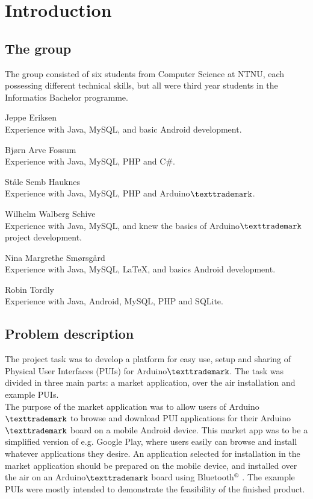 \chapter{Introduction}
\section{The group}
The group consisted of six students from Computer Science at NTNU, each possessing different technical skills, but all were third year students in the Informatics Bachelor programme.

\begin{description}
	\item{Jeppe Eriksen}\hfill \\
		Experience with Java, MySQL, and basic Android development.
	\item{Bjørn Arve Fossum}\hfill \\
		Experience with Java, MySQL, PHP and C\#.
	\item{Ståle Semb Hauknes}\hfill \\
		Experience with Java, MySQL, PHP and Arduino$\texttrademark$.
	\item{Wilhelm Walberg Schive}\hfill \\
		Experience with Java, MySQL, and knew the basics of Arduino$\texttrademark$ project development.
	\item{Nina Margrethe Smørsgård}\hfill \\
		Experience with Java, MySQL, \LaTeX, and basics Android development.
	\item{Robin Tordly}\hfill \\
		Experience with Java, Android, MySQL, PHP and SQLite.
\end{description}

\section{Problem description}
The project task was to develop a platform for easy use, setup and sharing of Physical User Interfaces (PUIs) for Arduino$\texttrademark$. The task was divided in three main parts: a market application, over the air installation and example PUIs.\\
\newline
The purpose of the market application was to allow users of Arduino$\texttrademark$ to browse and download PUI applications for their Arduino$\texttrademark$ board on a mobile Android device. This market app was to be a simplified version of e.g. Google Play, where users easily can browse and install whatever applications they desire. An application selected for installation in the market application should be prepared on the mobile device, and installed over the air on an Arduino$\texttrademark$ board using Bluetooth$\textsuperscript{\textregistered}$ . The example PUIs were mostly intended to demonstrate the feasibility of the finished product.

